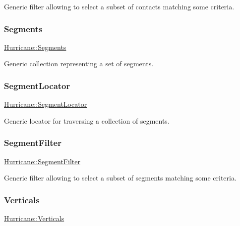 Generic filter allowing to select a subset of contacts matching some criteria. \mbox{\label{namespaceHurricane_a30748fa53a81cb597d4a13d651238716}} 
\subsubsection{\texorpdfstring{Segments}{Segments}}
{\footnotesize\ttfamily \hyperlink{namespaceHurricane_a30748fa53a81cb597d4a13d651238716}{Hurricane\+::\+Segments}}

Generic collection representing a set of segments. \mbox{\label{namespaceHurricane_a37c8302c278e8c1c60c6ffc0222ec4c8}} 
\subsubsection{\texorpdfstring{Segment\+Locator}{SegmentLocator}}
{\footnotesize\ttfamily \hyperlink{namespaceHurricane_a37c8302c278e8c1c60c6ffc0222ec4c8}{Hurricane\+::\+Segment\+Locator}}

Generic locator for traversing a collection of segments. \mbox{\label{namespaceHurricane_a891c4a2d614e158d183dada8b0ab1747}} 
\subsubsection{\texorpdfstring{Segment\+Filter}{SegmentFilter}}
{\footnotesize\ttfamily \hyperlink{namespaceHurricane_a891c4a2d614e158d183dada8b0ab1747}{Hurricane\+::\+Segment\+Filter}}

Generic filter allowing to select a subset of segments matching some criteria. \mbox{\label{namespaceHurricane_a146e2d3d34b4035aff422f12e85345b9}} 
\subsubsection{\texorpdfstring{Verticals}{Verticals}}
{\footnotesize\ttfamily \hyperlink{namespaceHurricane_a146e2d3d34b4035aff422f12e85345b9}{Hurricane\+::\+Verticals}}


